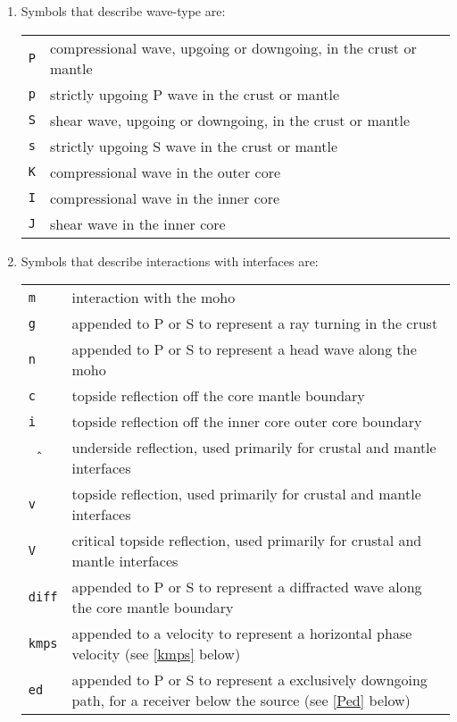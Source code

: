 \begin{enumerate}
\item Symbols that describe wave-type are:

\begin{tabular}{lp{5.0in}}
\texttt{P} & compressional wave, upgoing or downgoing, in the crust or mantle \\
\texttt{p} & strictly upgoing P wave in the crust or mantle \\
\texttt{S} & shear wave, upgoing or downgoing, in the crust or mantle \\
\texttt{s} & strictly upgoing S wave in the crust or mantle \\
\texttt{K} & compressional wave in the outer core \\
\texttt{I} & compressional wave in the inner core \\
\texttt{J} & shear wave in the inner core \\
\end{tabular}

\item Symbols that describe interactions with interfaces are:

\begin{tabular}{lp{5.0in}}
\texttt{m} & interaction with the moho \\
\texttt{g} & appended to P or S to represent a ray turning in the crust \\
\texttt{n} & appended to P or S to represent a head wave along the moho \\
\texttt{c} & topside reflection off the core mantle boundary \\
\texttt{i} & topside reflection off the inner core outer core boundary \\
\texttt{\^\,} & underside reflection, used primarily for crustal and mantle interfaces \\
\texttt{v} & topside reflection, used primarily for crustal and mantle interfaces \\
\texttt{V} & critical topside reflection, used primarily for crustal and mantle interfaces \\
\texttt{diff} & appended to P or S to represent a diffracted wave along the core mantle boundary \\
\texttt{kmps} & appended to a velocity to represent a horizontal phase velocity (see
\ref{kmps} below)\\
\texttt{ed} & appended to P or S to represent a exclusively downgoing path, for a receiver below the source (see
\ref{Ped} below)\\
\end{tabular}


\end{enumerate}
